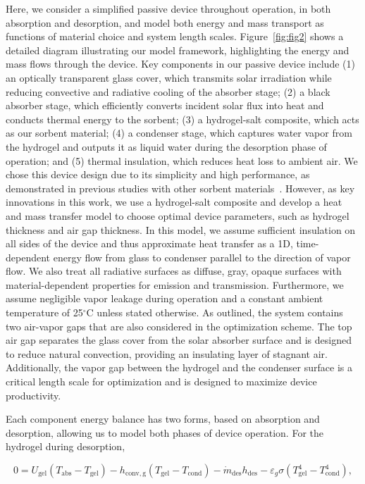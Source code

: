 \documentclass[11pt]{article}
\begin{document}
Here, we consider a simplified passive device throughout operation, in both absorption and desorption, and model both energy and mass transport as functions of material choice and system length scales. Figure~\ref{fig:fig2} shows a detailed diagram illustrating our model framework, highlighting the energy and mass flows through the device. Key components in our passive device include (1) an optically transparent glass cover, which transmits solar irradiation while reducing convective and radiative cooling of the absorber stage; (2) a black absorber stage, which efficiently converts incident solar flux into heat and conducts thermal energy to the sorbent; (3) a hydrogel-salt composite, which acts as our sorbent material; (4) a condenser stage, which captures water vapor from the hydrogel and outputs it as liquid water during the desorption phase of operation; and (5) thermal insulation, which reduces heat loss to ambient air. We chose this device design due to its simplicity and high performance, as demonstrated in previous studies with other sorbent materials~\cite{lapotin2021,li2024}. However, as key innovations in this work, we use a hydrogel-salt composite and develop a heat and mass transfer model to choose optimal device parameters, such as hydrogel thickness and air gap thickness. In this model, we assume sufficient insulation on all sides of the device and thus approximate heat transfer as a 1D, time-dependent energy flow from glass to condenser parallel to the direction of vapor flow. We also treat all radiative surfaces as diffuse, gray, opaque surfaces with material-dependent properties for emission and transmission. Furthermore, we assume negligible vapor leakage during operation and a constant ambient temperature of 25$^\circ$C unless stated otherwise. As outlined, the system contains two air-vapor gaps that are also considered in the optimization scheme. The top air gap separates the glass cover from the solar absorber surface and is designed to reduce natural convection, providing an insulating layer of stagnant air. Additionally, the vapor gap between the hydrogel and the condenser surface is a critical length scale for optimization and is designed to maximize device productivity.

Each component energy balance has two forms, based on absorption and desorption, allowing us to model both phases of device operation. For the hydrogel during desorption,

\begin{equation}
0 = U_{\mathrm{gel}}\left(T_{\mathrm{abs}} - T_{\mathrm{gel}}\right) - h_{\mathrm{conv,g}}\left(T_{\mathrm{gel}} - T_{\mathrm{cond}}\right) - \dot{m}_{\mathrm{des}} h_{\mathrm{des}} - \varepsilon_g \sigma \left(T_{\mathrm{gel}}^4 - T_{\mathrm{cond}}^4\right),
\label{eq:1}
\end{equation}
\end{document}
